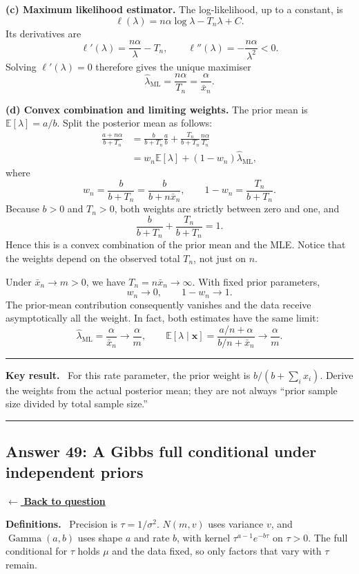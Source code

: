 \documentclass[11pt,a4paper]{article}
\newcommand{\given}{\mathrel{|}}
\newcommand{\xvec}{\boldsymbol{x}}
\newcommand{\E}{\mathbb{E}}
\newcommand{\answernav}[1]{%
  \label{answer:#1}%
  \noindent\hyperref[question:#1]{$\leftarrow$ \textbf{Back to question}}%
  \par\smallskip}
\newcommand{\studyheading}[1]{%
  \par\medskip\noindent\textcolor{statblue}{\textbf{#1.}}\ }
\newenvironment{keyresult}
  {\begin{center}\begin{minipage}{0.92\linewidth}\color{statblue}%
   \hrule\vspace{6pt}\textbf{Key result.}\ }
  {\vspace{6pt}\hrule\end{minipage}\end{center}}
\begin{document}
\textbf{(c) Maximum likelihood estimator.}
The log-likelihood, up to a constant, is
\[
\ell(\lambda)=n\alpha\log\lambda-T_n\lambda+C.
\]
Its derivatives are
\[
\ell'(\lambda)=\frac{n\alpha}{\lambda}-T_n,
\qquad \ell''(\lambda)=-\frac{n\alpha}{\lambda^2}<0.
\]
Solving $\ell'(\lambda)=0$ therefore gives the unique maximiser
\[
\boxed{\widehat\lambda_{\mathrm{ML}}=\frac{n\alpha}{T_n}
=\frac{\alpha}{\bar x_n}.}
\]

\textbf{(d) Convex combination and limiting weights.}
The prior mean is $\E[\lambda]=a/b$. Split the posterior mean as follows:
\begin{align*}
\frac{a+n\alpha}{b+T_n}
&=\frac{b}{b+T_n}\frac ab
+\frac{T_n}{b+T_n}\frac{n\alpha}{T_n}\\
&=w_n\E[\lambda]+(1-w_n)\widehat\lambda_{\mathrm{ML}},
\end{align*}
where
\[
\boxed{w_n=\frac{b}{b+T_n}=\frac{b}{b+n\bar x_n},
\qquad 1-w_n=\frac{T_n}{b+T_n}.}
\]
Because $b>0$ and $T_n>0$, both weights are strictly between zero and one,
and
\[
\frac{b}{b+T_n}+\frac{T_n}{b+T_n}=1.
\]
Hence this is a convex combination of the prior mean and the MLE. Notice
that the weights depend on the observed total $T_n$, not just on $n$.

Under $\bar x_n\to m>0$, we have $T_n=n\bar x_n\to\infty$. With fixed
prior parameters,
\[
\boxed{w_n\longrightarrow0,\qquad1-w_n\longrightarrow1.}
\]
The prior-mean contribution consequently vanishes and the data receive
asymptotically all the weight. In fact, both estimates have the same limit:
\[
\widehat\lambda_{\mathrm{ML}}=\frac\alpha{\bar x_n}
\longrightarrow\frac\alpha m,
\qquad
\E[\lambda\given\xvec]
=\frac{a/n+\alpha}{b/n+\bar x_n}
\longrightarrow\frac\alpha m.
\]

\begin{keyresult}
For this rate parameter, the prior weight is $b/(b+\sum_i x_i)$.
Derive the weights from the actual posterior mean; they are not always
``prior sample size divided by total sample size.''
\end{keyresult}

\clearpage

\subsection{Answer 49: A Gibbs full conditional under independent priors}
\answernav{49}

\studyheading{Definitions}
Precision is $\tau=1/\sigma^2$.
$N(m,v)$ uses variance $v$, and $\operatorname{Gamma}(a,b)$ uses shape $a$ and rate $b$, with kernel $\tau^{a-1}e^{-b\tau}$ on $\tau>0$.
The full conditional for $\tau$ holds $\mu$ and the data fixed, so only factors that vary with $\tau$ remain.
\end{document}
